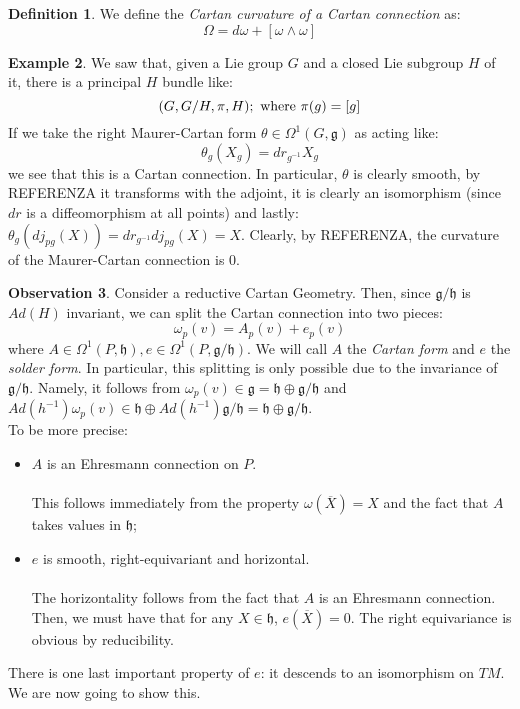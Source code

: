 \documentclass[12pt,a4paper]{report}
\theoremstyle{definition}
\newtheorem{Def}{Definition}[chapter]
\theoremstyle{Theorem}
\theoremstyle{definition}
\newtheorem{Ex}[Def]{Example}
\theoremstyle{definition}
\newtheorem{Obs}[Def]{Observation}
\begin{document}
		\begin{Def}
			We define the \textit{Cartan curvature of a Cartan connection} as:
			$$\Omega=d\omega+[\omega\wedge \omega]$$
		\end{Def}
		\begin{Ex}
			We saw that, given a Lie group $G$ and a closed Lie subgroup $H$ of it, there is a principal $H$ bundle like:
			$$(G,G/H,\pi,H); \hbox{ where }\pi(g)=[g]$$
			If we take the right Maurer-Cartan form $\theta\in\Omega^1(G,\mathfrak{g})$ as acting like:
			$$\theta_g(X_g)=dr_{g^{-1}}X_g$$
			we see that this is a Cartan connection. In particular, $\theta$ is clearly smooth, by REFERENZA it transforms with the adjoint, it is clearly an isomorphism (since $dr$ is a diffeomorphism at all points) and lastly:
			$\theta_g(dj_{pg}(X))=dr_{g^{-1}}dj_{pg}(X)=X$. Clearly, by REFERENZA, the curvature of the Maurer-Cartan connection is 0.
		\end{Ex}
	\begin{Obs}
		Consider a reductive Cartan Geometry. Then, since $\mathfrak{g/h}$ is $Ad(H)$ invariant, we can split the Cartan connection into two pieces:
		$$\omega_p(v)=A_p(v)+e_p(v)$$
		where $A\in\Omega^1(P,\mathfrak{h}),e\in\Omega^1(P,\mathfrak{g/h})$. We will call $A$ the \textit{Cartan form} and $e$ the \textit{solder form}. In particular, this splitting is only possible due to the invariance of $\mathfrak{g/h}$. Namely, it follows from $\omega_p(v)\in\mathfrak{g}=\mathfrak{h}\oplus\mathfrak{g/h}$ and $Ad(h^{-1})\omega_p(v)\in \mathfrak{h}\oplus Ad(h^{-1})\mathfrak{g/h}=\mathfrak{h}\oplus \mathfrak{g/h}$.\\ 
		To be more precise:
		\begin{itemize}
			\item $A$ is an Ehresmann connection on $P$.\\
			\\
			This follows immediately from the property $\omega(\overline{X})=X$ and the fact that $A$ takes values in $\mathfrak{h}$;
			\item $e$ is smooth, right-equivariant and horizontal.\\
			\\
			The horizontality follows from the fact that $A$ is an Ehresmann connection. Then, we must have that for any $X\in\mathfrak{h}$, $e(\overline{X})=0$. The right equivariance is obvious by reducibility.
		\end{itemize}
		There is one last important property of $e$: it descends to an isomorphism on $TM$. We are now going to show this.
	\end{Obs}
\end{document}
